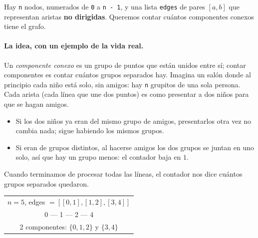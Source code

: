 
Hay \texttt{n} nodos, numerados de \texttt{0} a \texttt{n - 1}, y una lista
\texttt{edges} de pares $[a, b]$ que representan aristas \textbf{no
dirigidas}. Queremos contar cuántos componentes conexos tiene el grafo.

\paragraph{La idea, con un ejemplo de la vida real.} Un \emph{componente conexo}
es un grupo de puntos que están unidos entre sí; contar componentes es contar
cuántos grupos separados hay. Imagina un salón donde al principio cada niño está
solo, sin amigos: hay \texttt{n} grupitos de una sola persona. Cada arista (cada
línea que une dos puntos) es como presentar a dos niños para que se hagan
amigos.
\begin{itemize}
  \item Si los dos niños ya eran del mismo grupo de amigos, presentarlos otra
        vez no cambia nada; sigue habiendo los mismos grupos.
  \item Si eran de grupos distintos, al hacerse amigos los dos grupos se juntan
        en uno solo, así que hay un grupo menos: el contador baja en $1$.
\end{itemize}
Cuando terminamos de procesar todas las líneas, el contador nos dice cuántos
grupos separados quedaron.

\begin{center}
\ttfamily
\begin{tabular}{c}
$n=5$, edges $=[[0,1],[1,2],[3,4]]$\\[4pt]
0 --- 1 --- 2 \qquad\qquad 3 --- 4\\[4pt]
2 componentes: $\{0,1,2\}$ y $\{3,4\}$
\end{tabular}
\end{center}

